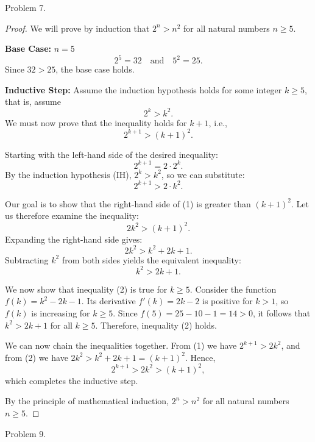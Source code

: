 \documentclass{article}
\begin{document}
Problem 7.
\begin{proof}
We will prove by induction that $2^{n} > n^{2}$ for all natural numbers $n \geq 5$.

\textbf{Base Case: } $n = 5$
\[
2^{5} = 32 \quad \text{and} \quad 5^{2} = 25.
\]
Since $32 > 25$, the base case holds.

\textbf{Inductive Step:} Assume the induction hypothesis holds for some integer $k \geq 5$, that is, assume
\[
2^{k} > k^{2}. \tag{IH}
\]
We must now prove that the inequality holds for $k+1$, i.e.,
\[
2^{k+1} > (k+1)^{2}.
\]

Starting with the left-hand side of the desired inequality:
\[
2^{k+1} = 2 \cdot 2^{k}.
\]
By the induction hypothesis (IH), $2^{k} > k^{2}$, so we can substitute:
\[
2^{k+1} > 2 \cdot k^{2}. \tag{1}
\]

Our goal is to show that the right-hand side of (1) is greater than $(k+1)^{2}$. Let us therefore examine the inequality:
\[
2k^{2} > (k+1)^{2}.
\]
Expanding the right-hand side gives:
\[
2k^{2} > k^{2} + 2k + 1.
\]
Subtracting $k^2$ from both sides yields the equivalent inequality:
\[
k^{2} > 2k + 1. \tag{2}
\]

We now show that inequality (2) is true for $k \geq 5$. Consider the function $f(k) = k^{2} - 2k - 1$. Its derivative $f'(k) = 2k - 2$ is positive for $k > 1$, so $f(k)$ is increasing for $k \geq 5$. Since $f(5) = 25 - 10 - 1 = 14 > 0$, it follows that $k^{2} > 2k + 1$ for all $k \geq 5$. Therefore, inequality (2) holds.

We can now chain the inequalities together. From (1) we have $2^{k+1} > 2k^{2}$, and from (2) we have $2k^{2} > k^{2} + 2k + 1 = (k+1)^{2}$. Hence,
\[
2^{k+1} > 2k^{2} > (k+1)^{2},
\]
which completes the inductive step.

By the principle of mathematical induction, $2^{n} > n^{2}$ for all natural numbers $n \geq 5$.
\end{proof}

Problem 9.
\end{document}

